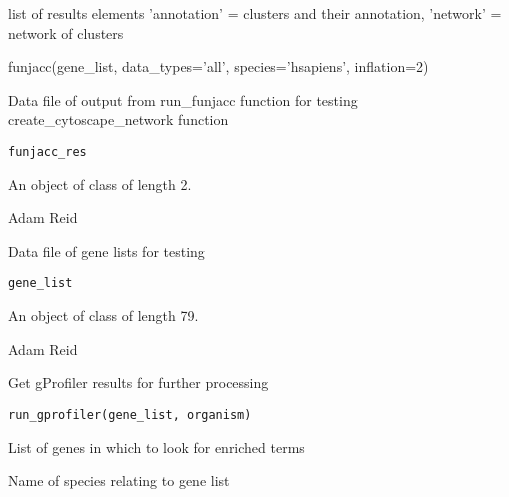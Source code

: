 \documentclass[a4paper]{book}
\begin{document}
%
\begin{Value}
list of results elements 'annotation' = clusters and their annotation, 'network' = network of clusters
\end{Value}
%
\begin{Examples}
\begin{ExampleCode}
funjacc(gene_list, data_types='all', species='hsapiens', inflation=2)
\end{ExampleCode}
\end{Examples}
%
\begin{Description}
Data file of output from run\_funjacc function for testing create\_cytoscape\_network function
\end{Description}
%
\begin{Usage}
\begin{verbatim}
funjacc_res
\end{verbatim}
\end{Usage}
%
\begin{Format}
An object of class  of length 2.
\end{Format}
%
\begin{Author}
Adam Reid 
\end{Author}
%
\begin{Description}
Data file of gene lists for testing
\end{Description}
%
\begin{Usage}
\begin{verbatim}
gene_list
\end{verbatim}
\end{Usage}
%
\begin{Format}
An object of class  of length 79.
\end{Format}
%
\begin{Author}
Adam Reid 
\end{Author}
%
\begin{Description}
Get gProfiler results for further processing
\end{Description}
%
\begin{Usage}
\begin{verbatim}
run_gprofiler(gene_list, organism)
\end{verbatim}
\end{Usage}
%
\begin{Arguments}
\begin{ldescription}
\item[\code{gene\_list}] List of genes in which to look for enriched terms

\item[\code{organism}] Name of species relating to gene list
\end{ldescription}
\end{Arguments}
\printindex{}
\end{document}
